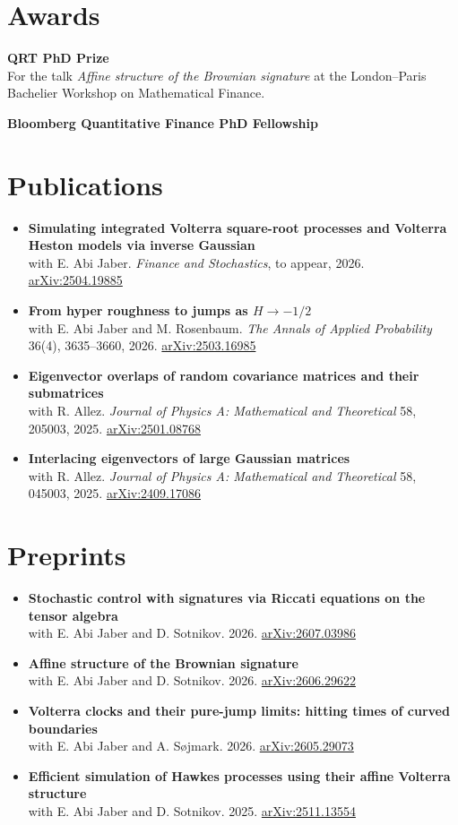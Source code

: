 \documentclass[11pt,a4paper]{article}
\let\oldsection\section
\renewcommand{\section}{\Needspace{5\baselineskip}\oldsection}
\newlength{\leftcol}
\newcommand{\entry}[2]{%
  \makebox[\leftcol][l]{\small #1}%
  \parbox[t]{\dimexpr\linewidth-\leftcol\relax}{#2}\par
  \vspace{5pt}}
\newcommand{\pub}[4]{%
  \item \textbf{#1}\\
  {\small #2. #3.
  \href{https://arxiv.org/abs/#4}{arXiv:#4}}}
\begin{document}
\section{Awards}
\entry{2026}{\textbf{QRT PhD Prize}\\
  For the talk \emph{Affine structure of the Brownian signature} at the London--Paris Bachelier Workshop on Mathematical Finance.}
\entry{2025}{\textbf{Bloomberg Quantitative Finance PhD Fellowship}}

\section{Publications}
\begin{itemize}[leftmargin=*,itemsep=4pt]
  \pub{Simulating integrated Volterra square-root processes and Volterra Heston models via inverse Gaussian}
      {with E. Abi Jaber}
      {\emph{Finance and Stochastics}, to appear, 2026}
      {2504.19885}
  \pub{From hyper roughness to jumps as $H \to -1/2$}
      {with E. Abi Jaber and M. Rosenbaum}
      {\emph{The Annals of Applied Probability} 36(4), 3635--3660, 2026}
      {2503.16985}
  \pub{Eigenvector overlaps of random covariance matrices and their submatrices}
      {with R. Allez}
      {\emph{Journal of Physics A: Mathematical and Theoretical} 58, 205003, 2025}
      {2501.08768}
  \pub{Interlacing eigenvectors of large Gaussian matrices}
      {with R. Allez}
      {\emph{Journal of Physics A: Mathematical and Theoretical} 58, 045003, 2025}
      {2409.17086}
\end{itemize}

\section{Preprints}
\begin{itemize}[leftmargin=*,itemsep=4pt]
  \pub{Stochastic control with signatures via Riccati equations on the tensor algebra}
      {with E. Abi Jaber and D. Sotnikov}
      {2026}
      {2607.03986}
  \pub{Affine structure of the Brownian signature}
      {with E. Abi Jaber and D. Sotnikov}
      {2026}
      {2606.29622}
  \pub{Volterra clocks and their pure-jump limits: hitting times of curved boundaries}
      {with E. Abi Jaber and A. Søjmark}
      {2026}
      {2605.29073}
  \pub{Efficient simulation of Hawkes processes using their affine Volterra structure}
      {with E. Abi Jaber and D. Sotnikov}
      {2025}
      {2511.13554}
\end{itemize}
\end{document}
